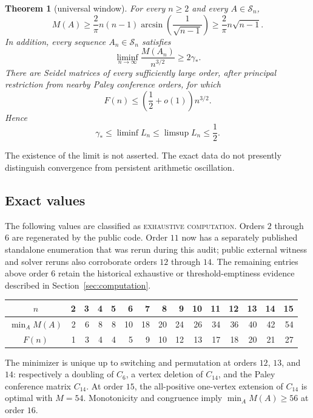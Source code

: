 \documentclass[11pt]{article}
\newtheorem{theorem}{Theorem}[section]
\theoremstyle{definition}
\theoremstyle{remark}
\newcommand{\Sn}{\mathcal S_n}
\newcommand{\statuscomputed}{\textcolor{blue!65!black}{\textsc{exhaustive computation}}}
\begin{document}
\begin{theorem}[universal window]\label{thm:window}
For every $n\ge2$ and every $A\in\Sn$,
\begin{equation}\label{eq:squared-gram-bound}
 M(A)\ge \frac{2}{\pi}n(n-1)
 \arcsin\!\left(\frac1{\sqrt{n-1}}\right)
 \ge \frac{2}{\pi}n\sqrt{n-1}.
\end{equation}
In addition, every sequence $A_n\in\mathcal S_n$ satisfies
\[
 \liminf_{n\to\infty}\frac{M(A_n)}{n^{3/2}}\ge2\gamma_*.
\]
There are Seidel matrices of every sufficiently large order, after principal
restriction from nearby Paley conference orders, for which
\[
 F(n)\le\left(\frac12+o(1)\right)n^{3/2}.
\]
Hence
\[
 \gamma_*\le\liminf L_n\le\limsup L_n\le\frac12.
\]
\end{theorem}

The existence of the limit is not asserted.  The exact data do not presently
distinguish convergence from persistent arithmetic oscillation.

\subsection{Exact values}

 The following values are classified as \statuscomputed.  Orders $2$ through
 $6$ are regenerated by the public code.  Order $11$ now has a separately
 published standalone enumeration that was rerun during this audit; public
 external witness and solver reruns also corroborate orders $12$ through $14$.
 The remaining entries above order $6$ retain the historical exhaustive or
 threshold-emptiness evidence described in Section~\ref{sec:computation}.

\begin{center}
\begin{tabular}{c|rrrrrrrrrrrrrr}
\toprule
$n$&2&3&4&5&6&7&8&9&10&11&12&13&14&15\\
\midrule
$\min_A M(A)$&2&6&8&8&10&18&20&24&26&34&36&40&42&54\\
$F(n)$&1&3&4&4&5&9&10&12&13&17&18&20&21&27\\
\bottomrule
\end{tabular}
\end{center}

The minimizer is unique up to switching and permutation at orders $12$, $13$,
and $14$: respectively a doubling of $C_6$, a vertex deletion of $C_{14}$,
and the Paley conference matrix $C_{14}$.  At order $15$, the all-positive
one-vertex extension of $C_{14}$ is optimal with $M=54$.  Monotonicity and
congruence imply $\min_A M(A)\ge56$ at order $16$.
\end{document}
